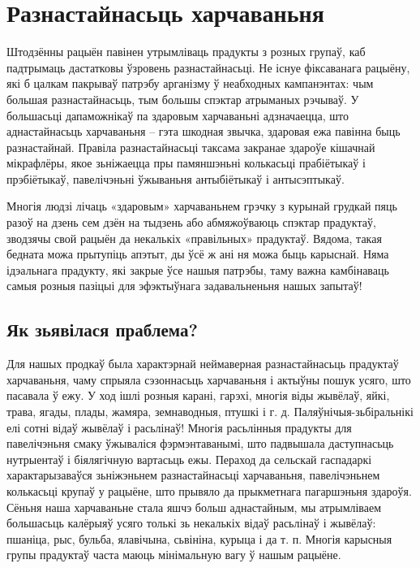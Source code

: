 \chapter{Разнастайнасьць харчаваньня}

Штодзённы рацыён павінен утрымліваць прадукты з розных групаў, каб падтрымаць дастатковы ўзровень разнастайнасьці. Не існуе фіксаванага рацыёну, які б цалкам пакрываў патрэбу арганізму ў неабходных кампанэнтах: чым большая разнастайнасьць, тым большы спэктар атрыманых рэчываў. У большасьці дапаможнікаў па здаровым харчаваньні адзначаецца, што аднастайнасьць харчаваньня – гэта шкодная звычка, здаровая ежа павінна быць разнастайнай. Правіла разнастайнасьці таксама закранае здароўе кішачнай мікрафлёры, якое зьніжаецца пры памяншэньні колькасьці прабіётыкаў і прэбіётыкаў, павелічэньні ўжываньня антыбіётыкаў і антысэптыкаў.

Многія людзі лічаць «здаровым» харчаваньнем грэчку з курынай грудкай пяць разоў на дзень сем дзён на тыдзень або абмяжоўваюць спэктар прадуктаў, зводзячы свой рацыён да некалькіх «правільных» прадуктаў. Вядома, такая бедната можа прытупіць апэтыт, ды ўсё ж ані ня можа быць карыснай. Няма ідэальнага прадукту, які закрые ўсе нашыя патрэбы, таму важна камбінаваць самыя розныя пазіцыі для эфэктыўнага задавальненьня нашых запытаў!

\section{Як зьявілася праблема?}

Для нашых продкаў была характэрнай неймаверная разнастайнасьць прадуктаў харчаваньня, чаму спрыяла сэзоннасьць харчаваньня і актыўны пошук усяго, што пасавала ў ежу. У ход ішлі розныя карані, гарэхі, многія віды жывёлаў, яйкі, трава, ягады, плады, жамяра, земнаводныя, птушкі і г. д. Паляўнічыя-зьбіральнікі елі сотні відаў жывёлаў і расьлінаў! Многія расьлінныя прадукты для павелічэньня смаку ўжываліся фэрмэнтаванымі, што падвышала даступнасьць нутрыентаў і біялягічную вартасьць ежы. Пераход да сельскай гаспадаркі характарызаваўся зьніжэньнем разнастайнасьці харчаваньня, павелічэньнем колькасьці крупаў у рацыёне, што прывяло да прыкметнага пагаршэньня здароўя. Сёньня наша харчаваньне стала яшчэ больш аднастайным, мы атрымліваем большасьць калёрыяў усяго толькі зь некалькіх відаў расьлінаў і жывёлаў: пшаніца, рыс, бульба, ялавічына, сьвініна, курыца і да т. п. Многія карысныя групы прадуктаў часта маюць мінімальную вагу ў нашым рацыёне.


